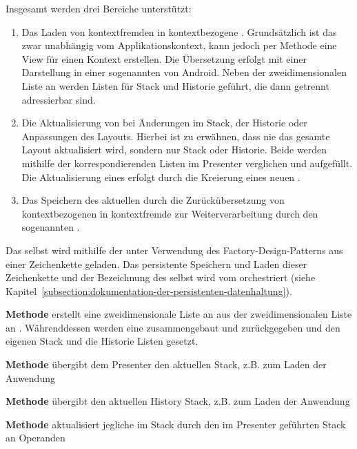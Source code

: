 Insgesamt werden drei Bereiche unterstützt:
\begin{enumerate}
	\item Das Laden von kontextfremden  in kontextbezogene . Grundsätzlich ist das  zwar unabhängig vom Applikationskontext, kann jedoch per Methode eine View für einen Kontext erstellen. Die Übersetzung erfolgt mit einer Darstellung in einer sogenannten  von Android. Neben der zweidimensionalen Liste an  werden Listen für Stack und Historie geführt, die dann getrennt adressierbar sind.
	\item Die Aktualisierung von  bei Änderungen im Stack, der Historie oder Anpassungen des Layouts. Hierbei ist zu erwähnen, dass nie das gesamte Layout aktualisiert wird, sondern nur Stack oder Historie. Beide werden mithilfe der korrespondierenden Listen im Presenter verglichen und aufgefüllt. Die Aktualisierung eines  erfolgt durch die Kreierung eines neuen .
	\item Das Speichern des aktuellen  durch die Zurückübersetzung von kontextbezogenen  in kontextfremde  zur Weiterverarbeitung durch den sogenannten .
\end{enumerate}
Das  selbst wird mithilfe der  unter Verwendung des Factory-Design-Patterns aus einer Zeichenkette geladen. Das persistente Speichern und Laden dieser Zeichenkette und der Bezeichnung des  selbst wird vom  orchestriert (siehe Kapitel~\ref{subsection:dokumentation-der-persistenten-datenhaltung}).

\textbf{Methode}  erstellt eine zweidimensionale Liste an  aus der zweidimensionalen Liste an . Währenddessen werden eine  zusammengebaut und zurückgegeben und den eigenen Stack und die Historie Listen gesetzt.

\textbf{Methode}  übergibt dem Presenter den aktuellen Stack, z.B. zum Laden der Anwendung

\textbf{Methode}  übergibt den aktuellen History Stack, z.B. zum Laden der Anwendung

\textbf{Methode}  aktualisiert jegliche  im Stack durch den im Presenter geführten Stack an Operanden

